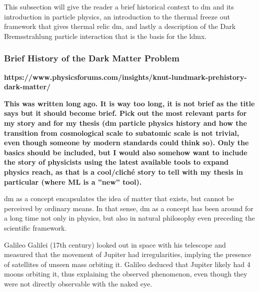 This subsection will give the reader a brief historical context to \gls{dm} and its introduction in particle physics, an introduction to the thermal freeze out framework that gives thermal relic \gls{dm}, and lastly a description of the Dark Bremsstrahlung particle interaction that is the basis for the \gls{ldmx}.

\subsubsection{Brief History of the Dark Matter Problem}
\label{sec:history}



\textbf{https://www.physicsforums.com/insights/knut-lundmark-prehistory-dark-matter/}

\textbf{This was written long ago. It is way too long, it is not brief as the title says but it should become brief. Pick out the most relevant parts for my story and for my thesis (\gls{dm} particle physics history and how the transition from cosmological scale to subatomic scale is not trivial, even though someone by modern standards could think so). Only the basics should be included, but I would also somehow want to include the story of physicists using the latest available tools to expand physics reach, as that is a cool/cliché story to tell with my thesis in particular (where ML is a ''new'' tool).}

\gls{dm} as a concept encapsulates the idea of matter that exists, but cannot be perceived by ordinary means. In that sense, \gls{dm} as a concept has been around for a long time not only in physics, but also in natural philosophy even preceding the scientific framework. \cite{bertone2016-history-dark-matter}

Galileo Galilei (17th century) looked out in space with his telescope and measured that the movement of Jupiter had irregularities, implying the presence of satellites of unseen mass orbiting it. Galileo deduced that Jupiter likely had 4 moons orbiting it, thus explaining the observed phenomenon, even though they were not directly observable with the naked eye. \cite{bertone2016-history-dark-matter}

